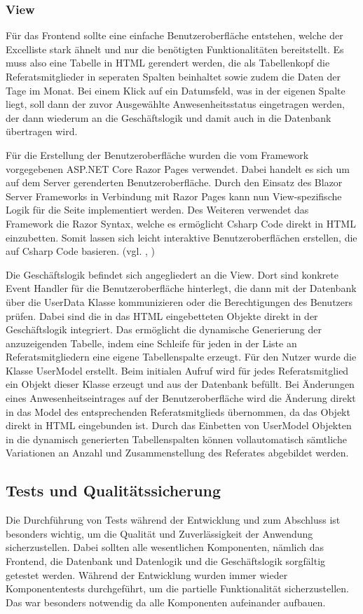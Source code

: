 \subsubsection{View}
\label{sec:View}
Für das Frontend sollte eine einfache Benutzeroberfläche entstehen, welche der Excelliste stark ähnelt und nur die benötigten Funktionalitäten bereitstellt. Es muss also eine Tabelle in HTML gerendert werden, die als Tabellenkopf die Referatsmitglieder in seperaten Spalten beinhaltet sowie zudem die Daten der Tage im Monat. Bei einem Klick auf ein Datumsfeld, was in der eigenen Spalte liegt, soll dann der zuvor Ausgewählte Anwesenheitsstatus eingetragen werden, der dann wiederum an die Geschäftslogik und damit auch in die Datenbank übertragen wird.

Für die Erstellung der Benutzeroberfläche wurden die vom Framework vorgegebenen ASP.NET Core Razor Pages verwendet. Dabei handelt es sich um auf dem Server gerenderten Benutzeroberfläche. Durch den Einsatz des Blazor Server Frameworks in Verbindung mit Razor Pages kann nun View-spezifische Logik für die Seite implementiert werden. Des Weiteren verwendet das Framework die Razor Syntax, welche es ermöglicht Csharp Code direkt in HTML einzubetten. Somit lassen sich leicht interaktive Benutzeroberflächen erstellen, die auf Csharp Code basieren. (vgl. \cite{Razor}, \cite{RazorSyntax})

Die Geschäftslogik befindet sich angegliedert an die View. Dort sind konkrete Event Handler für die Benutzeroberfläche hinterlegt, die dann \zB mit der Datenbank über die UserData Klasse kommunizieren oder die Berechtigungen des Benutzers prüfen. Dabei sind die in das HTML eingebetteten Objekte direkt in der Geschäftslogik integriert. Das ermöglicht die dynamische Generierung der anzuzeigenden Tabelle, indem eine Schleife für jeden in der Liste an Referatsmitgliedern eine eigene Tabellenspalte erzeugt. Für den Nutzer wurde die Klasse UserModel erstellt. Beim initialen Aufruf wird für jedes Referatsmitglied ein Objekt dieser Klasse erzeugt und aus der Datenbank befüllt. Bei Änderungen eines Anwesenheitseintrages auf der Benutzeroberfläche wird die Änderung direkt in das Model des entsprechenden Referatsmitglieds übernommen, da das Objekt direkt in HTML eingebunden ist. Durch das Einbetten von UserModel Objekten in die dynamisch generierten Tabellenspalten können vollautomatisch sämtliche Variationen an Anzahl und Zusammenstellung des Referates abgebildet werden. %


\subsection{Tests und Qualitätssicherung}
\label{sec:Tests}
Die Durchführung von Tests während der Entwicklung und zum Abschluss ist besonders wichtig, um die Qualität und Zuverlässigkeit der Anwendung sicherzustellen. Dabei sollten alle wesentlichen Komponenten, nämlich das Frontend, die Datenbank und Datenlogik und die Geschäftslogik sorgfältig getestet werden. Während der Entwicklung wurden immer wieder Komponententests durchgeführt, um die partielle Funktionalität sicherzustellen. Das war besonders notwendig da alle Komponenten aufeinander aufbauen.

